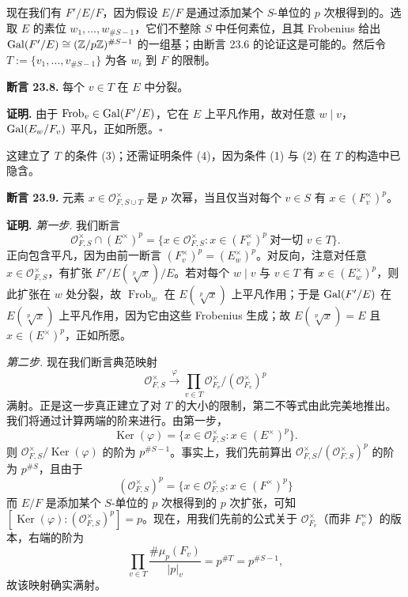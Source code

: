 现在我们有 $F'/E/F$，因为假设 $E/F$ 是通过添加某个 $S$-单位的 $p$ 次根得到的。选取 $E$ 的素位 $w_1,\dots,w_{\#S-1}$，它们不整除 $S$ 中任何素位，且其 Frobenius 给出 $\operatorname{Gal}(F'/E)\cong(\mathbb{Z}/p\mathbb{Z})^{\#S-1}$ 的一组基；由断言 23.6 的论证这是可能的。然后令 $T:=\{v_1,\dots,v_{\#S-1}\}$ 为各 $w_i$ 到 $F$ 的限制。

\textbf{断言 23.8.} 每个 $v\in T$ 在 $E$ 中分裂。

\textbf{证明.} 由于 $\operatorname{Frob}_v\in\operatorname{Gal}(F'/E)$，它在 $E$ 上平凡作用，故对任意 $w\mid v$，$\operatorname{Gal}(E_w/F_v)$ 平凡，正如所愿。\hfill$\square$

这建立了 $T$ 的条件 (3)；还需证明条件 (4)，因为条件 (1) 与 (2) 在 $T$ 的构造中已隐含。

\textbf{断言 23.9.} 元素 $x\in\mathcal{O}_{F,S\cup T}^\times$ 是 $p$ 次幂，当且仅当对每个 $v\in S$ 有 $x\in(F_v^\times)^p$。

\textbf{证明.} \emph{第一步.} 我们断言
\[
\mathcal{O}_{F,S}^\times\cap(E^\times)^p=\{x\in\mathcal{O}_{F,S}^\times:x\in(F_v^\times)^p\ \text{对一切 } v\in T\}.
\]
正向包含平凡，因为由前一断言 $(F_v^\times)^p=(E_w^\times)^p$。对反向，注意对任意 $x\in\mathcal{O}_{F,S}^\times$，有扩张 $F'/E(\sqrt[p]{x})/E$。若对每个 $w\mid v$ 与 $v\in T$ 有 $x\in(E_w^\times)^p$，则此扩张在 $w$ 处分裂，故 $\operatorname{Frob}_w$ 在 $E(\sqrt[p]{x})$ 上平凡作用；于是 $\operatorname{Gal}(F'/E)$ 在 $E(\sqrt[p]{x})$ 上平凡作用，因为它由这些 Frobenius 生成；故 $E(\sqrt[p]{x})=E$ 且 $x\in(E^\times)^p$，正如所愿。

\emph{第二步.} 现在我们断言典范映射
\[
\mathcal{O}_{F,S}^\times\xrightarrow{\ \varphi\ }\prod_{v\in T}\mathcal{O}_{F_v}^\times/(\mathcal{O}_{F_v}^\times)^p
\]
满射。正是这一步真正建立了对 $T$ 的大小的限制，第二不等式由此完美地推出。我们将通过计算两端的阶来进行。由第一步，
\[
\operatorname{Ker}(\varphi)=\{x\in\mathcal{O}_{F,S}^\times:x\in(E^\times)^p\}.
\]
则 $\mathcal{O}_{F,S}^\times/\operatorname{Ker}(\varphi)$ 的阶为 $p^{\#S-1}$。事实上，我们先前算出 $\mathcal{O}_{F,S}^\times/(\mathcal{O}_{F,S}^\times)^p$ 的阶为 $p^{\#S}$，且由于
\[
(\mathcal{O}_{F,S}^\times)^p=\{x\in\mathcal{O}_{F,S}^\times:x\in(F^\times)^p\}
\]
而 $E/F$ 是添加某个 $S$-单位的 $p$ 次根得到的 $p$ 次扩张，可知 $[\operatorname{Ker}(\varphi):(\mathcal{O}_{F,S}^\times)^p]=p$。现在，用我们先前的公式关于 $\mathcal{O}_{F_v}^\times$（而非 $F_v^\times$）的版本，右端的阶为
\[
\prod_{v\in T}\frac{\#\mu_p(F_v)}{|p|_v}=p^{\#T}=p^{\#S-1},
\]
故该映射确实满射。

